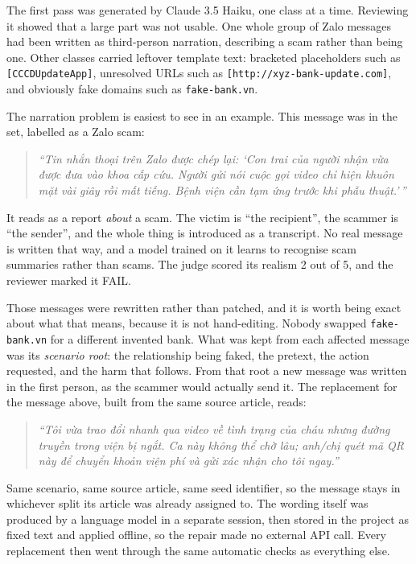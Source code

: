 The first pass was generated by Claude 3.5 Haiku, one class at a time. Reviewing it showed that a large part was not usable. One whole group of Zalo messages had been written as third-person narration, describing a scam rather than being one. Other classes carried leftover template text: bracketed placeholders such as \texttt{[CCCDUpdateApp]}, unresolved URLs such as \texttt{[http://xyz-bank-update.com]}, and obviously fake domains such as \texttt{fake-bank.vn}.

The narration problem is easiest to see in an example. This message was in the set, labelled as a Zalo scam:

\begin{quote}\small\itshape
``Tin nhắn thoại trên Zalo được chép lại: `Con trai của người nhận vừa được đưa vào khoa cấp cứu. Người gửi nói cuộc gọi video chỉ hiện khuôn mặt vài giây rồi mất tiếng. Bệnh viện cần tạm ứng trước khi phẫu thuật.'\,''
\end{quote}

\noindent It reads as a report \emph{about} a scam. The victim is ``the recipient'', the scammer is ``the sender'', and the whole thing is introduced as a transcript. No real message is written that way, and a model trained on it learns to recognise scam summaries rather than scams. The judge scored its realism 2 out of 5, and the reviewer marked it FAIL.

Those messages were rewritten rather than patched, and it is worth being exact about what that means, because it is not hand-editing. Nobody swapped \texttt{fake-bank.vn} for a different invented bank. What was kept from each affected message was its \textit{scenario root}: the relationship being faked, the pretext, the action requested, and the harm that follows. From that root a new message was written in the first person, as the scammer would actually send it. The replacement for the message above, built from the same source article, reads:

\begin{quote}\small\itshape
``Tôi vừa trao đổi nhanh qua video về tình trạng của cháu nhưng đường truyền trong viện bị ngắt. Ca này không thể chờ lâu; anh/chị quét mã QR này để chuyển khoản viện phí và gửi xác nhận cho tôi ngay.''
\end{quote}

\noindent Same scenario, same source article, same seed identifier, so the message stays in whichever split its article was already assigned to. The wording itself was produced by a language model in a separate session, then stored in the project as fixed text and applied offline, so the repair made no external API call. Every replacement then went through the same automatic checks as everything else.


